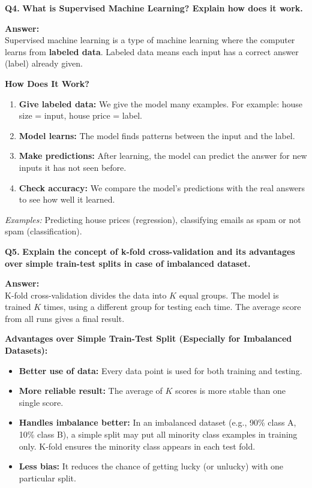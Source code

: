 \documentclass[12pt,a4paper]{article}
\newcommand{\question}[2]{%
    \begin{mdframed}[style=questionstyle]
        \textbf{\textcolor{headerblue}{Q#1.}} \textbf{#2}
    \end{mdframed}%
    \vspace{2pt}%
}
\newcommand{\ans}{\textbf{\textcolor{headerblue}{Answer:}}\\[4pt]}
\newcommand{\subhead}[1]{\textbf{\textcolor{headerblue}{#1}}}
\begin{document}
\vspace{10pt}
\question{4}{What is Supervised Machine Learning? Explain how does it work.}

\ans

Supervised machine learning is a type of machine learning where the computer learns from \textbf{labeled data}. Labeled data means each input has a correct answer (label) already given.

\subhead{How Does It Work?}
\begin{enumerate}[leftmargin=*]
    \item \textbf{Give labeled data:} We give the model many examples. For example: house size = input, house price = label.
    \item \textbf{Model learns:} The model finds patterns between the input and the label.
    \item \textbf{Make predictions:} After learning, the model can predict the answer for new inputs it has not seen before.
    \item \textbf{Check accuracy:} We compare the model's predictions with the real answers to see how well it learned.
\end{enumerate}

\textit{Examples:} Predicting house prices (regression), classifying emails as spam or not spam (classification).

\vspace{10pt}
\question{5}{Explain the concept of k-fold cross-validation and its advantages over simple train-test splits in case of imbalanced dataset.}

\ans

K-fold cross-validation divides the data into $K$ equal groups. The model is trained $K$ times, using a different group for testing each time. The average score from all runs gives a final result.

\subhead{Advantages over Simple Train-Test Split (Especially for Imbalanced Datasets):}
\begin{itemize}[leftmargin=*]
    \item \textbf{Better use of data:} Every data point is used for both training and testing.
    \item \textbf{More reliable result:} The average of $K$ scores is more stable than one single score.
    \item \textbf{Handles imbalance better:} In an imbalanced dataset (e.g., 90\% class A, 10\% class B), a simple split may put all minority class examples in training only. K-fold ensures the minority class appears in each test fold.
    \item \textbf{Less bias:} It reduces the chance of getting lucky (or unlucky) with one particular split.
\end{itemize}
\end{document}
